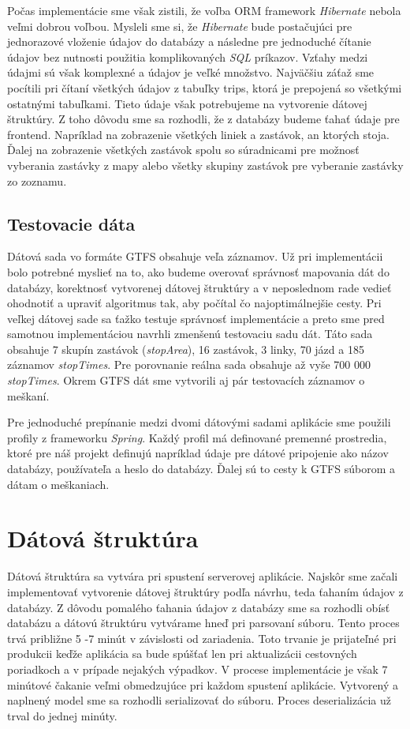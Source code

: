Počas implementácie sme však zistili, že voľba ORM framework \textit{Hibernate} nebola veľmi dobrou voľbou. Mysleli sme si, že \textit{Hibernate} bude postačujúci pre jednorazové vloženie údajov do databázy a následne pre jednoduché čítanie údajov bez nutnosti použitia komplikovaných \textit{SQL} príkazov. Vzťahy medzi údajmi sú však komplexné a údajov je veľké množstvo. Najväčšiu záťaž sme pocítili pri čítaní všetkých údajov z tabuľky trips, ktorá je prepojená so všetkými ostatnými tabuľkami. Tieto údaje však potrebujeme na vytvorenie dátovej štruktúry. Z toho dôvodu sme sa rozhodli, že z databázy budeme ťahať údaje pre frontend. Napríklad na zobrazenie všetkých liniek a zastávok, an ktorých stoja. Ďalej na zobrazenie všetkých zastávok spolu so súradnicami pre možnosť vyberania zastávky z mapy alebo všetky skupiny zastávok pre vyberanie zastávky zo zoznamu.

\subsection{Testovacie dáta}
Dátová sada vo formáte GTFS obsahuje veľa záznamov. Už pri implementácii bolo potrebné myslieť na to, ako budeme overovať správnosť mapovania dát do databázy, korektnosť vytvorenej dátovej štruktúry a v neposlednom rade vedieť ohodnotiť a upraviť algoritmus tak, aby počítal čo najoptimálnejšie cesty. Pri veľkej dátovej sade sa ťažko testuje správnosť implementácie a preto sme pred samotnou implementáciou navrhli zmenšenú testovaciu sadu dát. 
Táto sada obsahuje 7 skupín zastávok (\textit{stopArea}), 16 zastávok, 3 linky, 70 jázd a 185 záznamov \textit{stopTimes}. Pre porovnanie reálna sada obsahuje až vyše 700 000 \textit{stopTimes}. Okrem GTFS dát sme vytvorili aj pár testovacích záznamov o meškaní. 

Pre jednoduché prepínanie medzi dvomi dátovými sadami aplikácie sme použili profily z frameworku \textit{Spring}. Každý profil má definované premenné prostredia, ktoré pre náš projekt definujú napríklad údaje pre dátové pripojenie ako názov databázy, používateľa a heslo do databázy. Ďalej sú to cesty k GTFS súborom a dátam o meškaniach. 

\section{Dátová štruktúra}
Dátová štruktúra sa vytvára pri spustení serverovej aplikácie. Najskôr sme začali implementovať vytvorenie dátovej štruktúry podľa návrhu, teda ťahaním údajov z databázy. Z dôvodu pomalého ťahania údajov z databázy sme sa rozhodli obísť databázu a dátovú štruktúru vytvárame hneď pri parsovaní súboru. Tento proces trvá približne 5 -7 minút v závislosti od zariadenia. Toto trvanie je prijateľné pri produkcii keďže aplikácia sa bude spúšťať len pri aktualizácii cestovných poriadkoch a v prípade nejakých výpadkov. V procese implementácie je však 7 minútové čakanie veľmi obmedzujúce pri každom spustení aplikácie. Vytvorený a naplnený model sme sa rozhodli serializovať do súboru. Proces deserializácia už trval do jednej minúty. 

